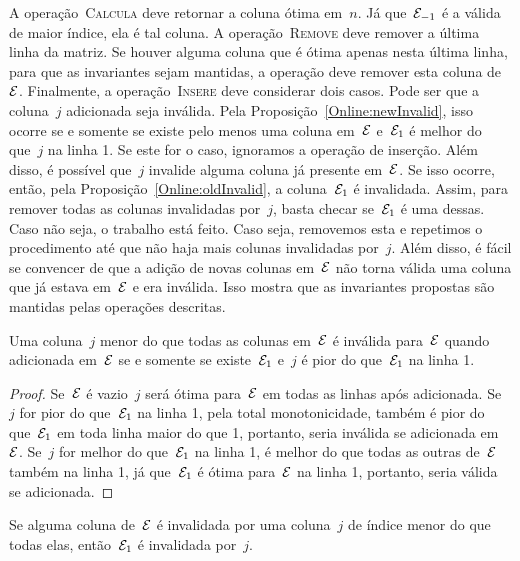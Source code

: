 A operação~\textsc{Calcula} deve retornar a coluna ótima em~$n$. Já que~$\mathcal{E}_{-1}$ é a válida de maior índice, ela é tal coluna. A operação~\textsc{Remove} deve remover a última linha da matriz. Se houver alguma coluna que é ótima apenas nesta última linha, para que as invariantes sejam mantidas, a operação deve remover esta coluna de~$\mathcal{E}$. Finalmente, a operação~\textsc{Insere} deve considerar dois casos. Pode ser que a coluna~$j$ adicionada seja inválida. Pela Proposição~\ref{Online:newInvalid}, isso ocorre se e somente se existe pelo menos uma coluna em~$\mathcal{E}$ e~$\mathcal{E}_1$ é melhor do que~$j$ na linha 1. Se este for o caso, ignoramos a operação de inserção. Além disso, é possível que~$j$ invalide alguma coluna já presente em~$\mathcal{E}$. Se isso ocorre, então, pela Proposição~\ref{Online:oldInvalid}, a coluna~$\mathcal{E}_1$ é invalidada. Assim, para remover todas as colunas invalidadas por~$j$, basta checar se~$\mathcal{E}_1$ é uma dessas. Caso não seja, o trabalho está feito. Caso seja, removemos esta e repetimos o procedimento até que não haja mais colunas invalidadas por~$j$. Além disso, é fácil se convencer de que a adição de novas colunas em~$\mathcal{E}$ não torna válida uma coluna que já estava em~$\mathcal{E}$ e era inválida. Isso mostra que as invariantes propostas são mantidas pelas operações descritas.

\begin{prop} \label{Online:newInvalid}
Uma coluna~$j$ menor do que todas as colunas em~$\mathcal{E}$ é inválida para~$\mathcal{E}$ quando adicionada em~$\mathcal{E}$ se e somente se existe~$\mathcal{E}_1$ e~$j$ é pior do que~$\mathcal{E}_1$ na linha 1.
\end{prop}

\begin{proof}
Se~$\mathcal{E}$ é vazio~$j$ será ótima para~$\mathcal{E}$ em todas as linhas após adicionada. Se~$j$ for pior do que~$\mathcal{E}_1$ na linha 1, pela total monotonicidade, também é pior do que~$\mathcal{E}_1$ em toda linha maior do que 1, portanto, seria inválida se adicionada em~$\mathcal{E}$. Se~$j$ for melhor do que~$\mathcal{E}_1$ na linha 1, é melhor do que todas as outras de~$\mathcal{E}$ também na linha 1, já que~$\mathcal{E}_1$ é ótima para~$\mathcal{E}$ na linha 1, portanto, seria válida se adicionada.
\end{proof}

\begin{prop} \label{Online:oldInvalid}
Se alguma coluna de~$\mathcal{E}$ é invalidada por uma coluna~$j$ de índice menor do que todas elas, então~$\mathcal{E}_1$ é invalidada por~$j$.
\end{prop}


